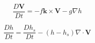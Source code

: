 \documentclass[preview]{standalone}
\begin{document}
\begin{equation*}
\frac{D\mathbf{V}}{Dt} = -f\mathbf{k}\times\mathbf{V} -g\nabla h
\end{equation*}

\begin{equation*}
\frac{Dh}{Dt} =\frac{Dh_s}{Dt} -(h-h_s)\nabla\cdot\mathbf{V} 
\end{equation*}
\end{document}
